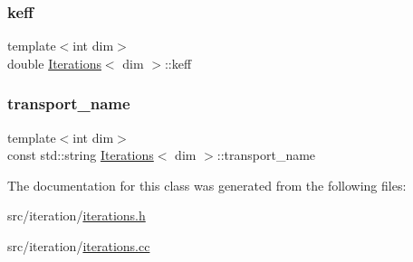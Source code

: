 \mbox{\label{class_iterations_a4c36c8bdd6775be8015ef113c68a1e66}} 
\subsubsection{\texorpdfstring{keff}{keff}}
{\footnotesize\ttfamily template$<$int dim$>$ \\
double \hyperlink{class_iterations}{Iterations}$<$ dim $>$\+::keff\hspace{0.3cm}{\ttfamily [private]}}

\mbox{\label{class_iterations_a3a29339b09351ffa95e9c99be5d5e575}} 
\subsubsection{\texorpdfstring{transport\+\_\+name}{transport\_name}}
{\footnotesize\ttfamily template$<$int dim$>$ \\
const std\+::string \hyperlink{class_iterations}{Iterations}$<$ dim $>$\+::transport\+\_\+name\hspace{0.3cm}{\ttfamily [private]}}



The documentation for this class was generated from the following files\+:\begin{DoxyCompactItemize}
\item 
src/iteration/\hyperlink{iterations_8h}{iterations.\+h}\item 
src/iteration/\hyperlink{iterations_8cc}{iterations.\+cc}\end{DoxyCompactItemize}
